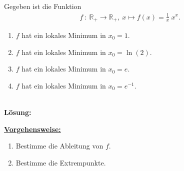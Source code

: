 \subsection*{}
Gegeben ist die Funktion 
\begin{align*}
f \ : \ \mathbb{R}_+ \to \mathbb{R}_+, \
x \mapsto f(x) = \frac{1}{x} \ x^x.
\end{align*}
\renewcommand{\labelenumi}{(\alph{enumi})}
\begin{enumerate}
\item $f$ hat ein lokales Minimum in $x_0 = 1$.
\item $f$ hat ein lokales Minimum in $x_0 = \ln(2)$.
\item $f$ hat ein lokales Minimum in $x_0 = e$.
\item $f$ hat ein lokales Minimum in $x_0 = e^{-1}$.


\end{enumerate}
\ \\
\textbf{Lösung:}
\begin{mdframed}
\underline{\textbf{Vorgehensweise:}}
\renewcommand{\labelenumi}{\theenumi.}
\begin{enumerate}
\item Bestimme die Ableitung von $f$.
\item Bestimme die Extrempunkte.
\end{enumerate}
\end{mdframed}

